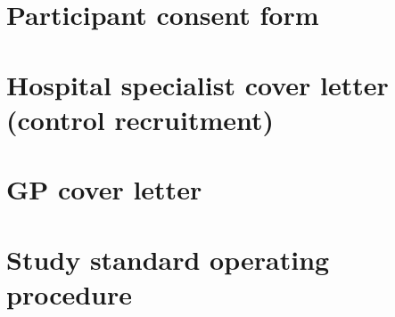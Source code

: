 \documentclass[a4paper,10pt]{article}
\begin{document}
\begin{appendices}
\section{Participant consent form}

\newpage

\section{Hospital specialist cover letter (control recruitment)}

\newpage

\section{GP cover letter}

\newpage

\section{Study standard operating procedure}

\newpage


\end{appendices}
     
\makeatletter
 \def\@biblabel#1{#1}
\makeatother



\end{document}
